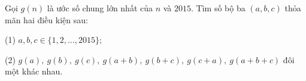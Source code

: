 \ifshowproblem
\begin{problem}\label{example:CHN-2015-GMO-P4}
    Gọi $g(n)$ là ước số chung lớn nhất của $n$ và $2015$. Tìm số bộ ba $(a,b,c)$ thỏa mãn hai điều kiện sau:

    (1) $a,b,c \in \{1,2,\ldots,2015\};$

    (2) $g(a),\ g(b),\ g(c),\ g(a+b),\ g(b+c),\ g(c+a),\ g(a+b+c)$ đôi một khác nhau.
\end{problem}
\fi

\footnotemark
{}
\fi